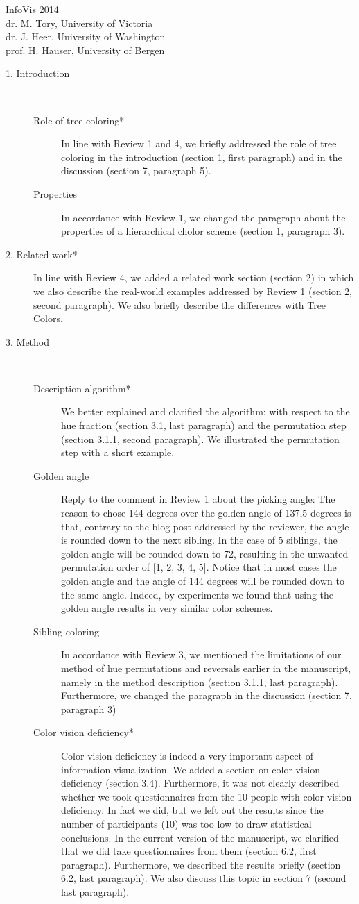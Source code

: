 \documentclass{letter}
\begin{document}
\begin{letter}{InfoVis 2014 \\ dr. M. Tory, University of Victoria \\ dr. J. Heer, University of Washington \\ prof. H. Hauser, University of Bergen}
\begin{description}
\item[1. Introduction] \mbox{ }
\begin{description}
\item[Role of tree coloring*] In line with Review 1 and 4, we briefly addressed the role of tree coloring in the introduction (section 1, first paragraph) and in the discussion (section 7, paragraph 5).
\item[Properties] In accordance with Review 1, we changed the paragraph about the properties of a hierarchical cholor scheme (section 1, paragraph 3).
\end{description}
\item[2. Related work*] In line with Review 4, we added a related work section (section 2) in which we also describe the real-world examples addressed by Review 1 (section 2, second paragraph). We also briefly describe the differences with Tree Colors.
\item[3. Method] \mbox{ }
\begin{description}
\item[Description algorithm*] We better explained and clarified the algorithm: with respect to the hue fraction (section 3.1, last paragraph) and the permutation step (section 3.1.1, second paragraph). We illustrated the permutation step with a short example. 
\item[Golden angle] Reply to the comment in Review 1 about the picking angle: The reason to chose 144 degrees over the golden angle of 137,5 degrees is that, contrary to the blog post addressed by the reviewer, the angle is rounded down to the next sibling. In the case of 5 siblings, the golden angle will be rounded down to 72, resulting in the unwanted permutation order of [1, 2, 3, 4, 5]. Notice that in most cases the golden angle and the angle of 144 degrees will be rounded down to the same angle. Indeed, by experiments we found that using the golden angle results in very similar color schemes.
\item[Sibling coloring] In accordance with Review 3, we mentioned the limitations of our method of hue permutations and reversals earlier in the manuscript, namely in the method description (section 3.1.1, last paragraph). Furthermore, we changed the paragraph in the discussion (section 7, paragraph 3)
\item[Color vision deficiency*] Color vision deficiency is indeed a very important aspect of information visualization. We added a section on color vision deficiency (section 3.4). Furthermore, it was not clearly described whether we took questionnaires from the 10 people with color vision deficiency. In fact we did, but we left out the results since the number of participants (10) was too low to draw statistical conclusions. In the current version of the manuscript, we clarified that we did take questionnaires from them (section 6.2, first paragraph). Furthermore, we described the results briefly (section 6.2, last paragraph). We also discuss this topic in section 7 (second last paragraph).

\end{description}
\end{description}
\end{letter}
\end{document}
